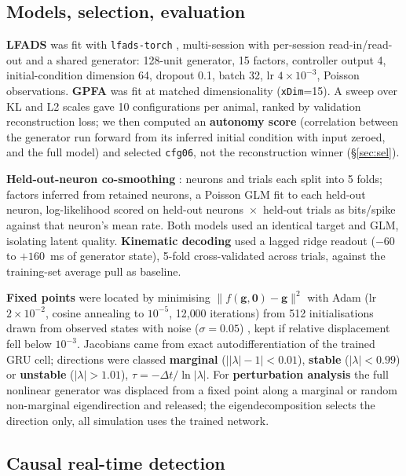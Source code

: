 \documentclass[10pt,twocolumn]{article}
\begin{document}
\subsection{Models, selection, evaluation}

\textbf{LFADS} \cite{pandarinath2018} was fit with \texttt{lfads-torch}
\cite{sedler2023}, multi-session with per-session read-in/read-out and a shared
generator: 128-unit generator, 15 factors, controller output 4,
initial-condition dimension 64, dropout 0.1, batch 32, lr $4\times10^{-3}$,
Poisson observations. \textbf{GPFA} \cite{yu2009} was fit at matched
dimensionality (\texttt{xDim}=15). A sweep over KL and L2 scales gave 10
configurations per animal, ranked by validation reconstruction loss; we then
computed an \textbf{autonomy score} (correlation between the generator run
forward from its inferred initial condition with input zeroed, and the full
model) and selected \texttt{cfg06}, not the reconstruction winner
(\S\ref{sec:sel}).

\textbf{Held-out-neuron co-smoothing} \cite{pei2021}: neurons and trials each
split into 5 folds; factors inferred from retained neurons, a Poisson GLM fit to
each held-out neuron, log-likelihood scored on held-out
neurons~$\times$~held-out trials as bits/spike against that neuron's mean rate.
Both models used an identical target and GLM, isolating latent quality.
\textbf{Kinematic decoding} used a lagged ridge readout ($-60$ to $+160$~ms of
generator state), 5-fold cross-validated across trials, against the
training-set average pull as baseline.

\textbf{Fixed points} were located by minimising
$\|f(\mathbf{g},\mathbf{0})-\mathbf{g}\|^2$ with Adam (lr $2\times10^{-2}$,
cosine annealing to $10^{-5}$, 12{,}000 iterations) from 512 initialisations
drawn from observed states with noise ($\sigma=0.05$) \cite{sussillo2013}, kept if relative displacement fell below
$10^{-3}$. Jacobians came from exact autodifferentiation of the trained GRU
cell; directions were classed \textbf{marginal} ($\big||\lambda|-1\big|<0.01$),
\textbf{stable} ($|\lambda|<0.99$) or \textbf{unstable} ($|\lambda|>1.01$),
$\tau=-\Delta t/\ln|\lambda|$. For \textbf{perturbation analysis} the full
nonlinear generator was displaced from a fixed point along a marginal or random
non-marginal eigendirection and released; the eigendecomposition selects the
direction only, all simulation uses the trained network.

\subsection{Causal real-time detection}
\end{document}
